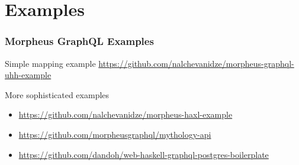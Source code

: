 \section{Examples}

\begin{frame}\frametitle{Morpheus GraphQL Examples}
  
\begin{block}{Simple mapping example}
    \url{https://github.com/nalchevanidze/morpheus-graphql-uhh-example}
\end{block}

\begin{block}{More sophisticated examples}
\begin{itemize}
    \item \url{https://github.com/nalchevanidze/morpheus-haxl-example}
    \item \url{https://github.com/morpheusgraphql/mythology-api}
    \item \url{https://github.com/dandoh/web-haskell-graphql-postgres-boilerplate}
\end{itemize}
\end{block}

\end{frame}